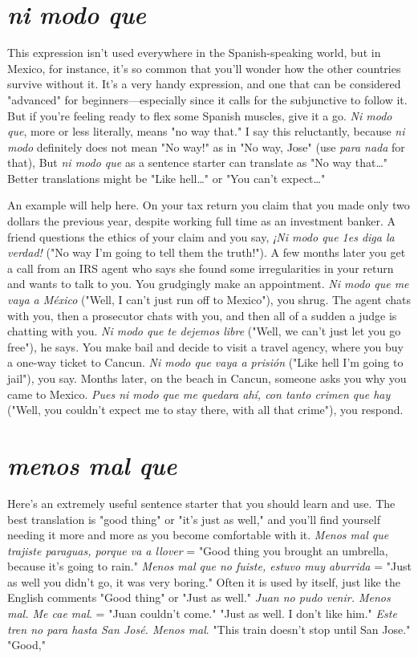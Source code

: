 \section{\emph{ni modo que}}

This expression isn't used everywhere in the Spanish-speaking
world, but in Mexico, for instance, it's so common that you'll wonder
how the other countries survive without it. It's a very handy expression, and one that can be considered "advanced" for beginners---especially since it calls for the subjunctive to follow it. But if you're feeling
ready to flex some Spanish muscles, give it a go. \emph{Ni modo que}, more or
less literally, means "no way that." I say this reluctantly, because \emph{ni
modo} definitely does not mean "No way!" as in "No way, Jose" (use
\emph{para nada} for that), But \emph{ni modo que} as a sentence starter can translate as "No way that\ldots{}" Better translations might be "Like hell\ldots{}"
or "You can't expect\ldots{}"

An example will help here. On your tax return you claim that
you made only two dollars the previous year, despite working full time
as an investment banker. A friend questions the ethics of your claim
and you say, \emph{¡Ni modo que 1es diga la verdad!} ("No way I'm going to
tell them the truth!"). A few months later you get a call from an IRS
agent who says she found some irregularities in your return and wants
to talk to you. You grudgingly make an appointment. \emph{Ni modo que me
vaya a México} ("Well, I can't just run off to Mexico"), you shrug. The
agent chats with you, then a prosecutor chats with you, and then all of
a sudden a judge is chatting with you. \emph{Ni modo que te dejemos libre}
("Well, we can't just let you go free"), he says. You make bail and decide to visit a travel agency, where you buy a one-way ticket to Cancun. \emph{Ni modo que vaya a prisión} ("Like hell I'm going to jail"), you
say. Months later, on the beach in Cancun, someone asks you why you
came to Mexico. \emph{Pues ni modo que me quedara ahí, con tanto crimen
que hay} ("Well, you couldn't expect me to stay there, with all that
crime"), you respond.

\section{\emph{menos mal que}}

Here's an extremely useful sentence starter that you should
learn and use. The best translation is "good thing" or "it's just as
well," and you'll find yourself needing it more and more as you become
comfortable with it. \emph{Menos mal que trajiste paraguas, porque va a
llover} = "Good thing you brought an umbrella, because it's going to
rain." \emph{Menos mal que no fuiste, estuvo muy aburrida} = "Just as well
you didn't go, it was very boring." Often it is used by itself, just like
the English comments "Good thing" or "Just as well." \emph{Juan no pudo
venir. Menos mal. Me cae mal}. = "Juan couldn't come." "Just as well.
I don't like him." \emph{Este tren no para hasta San José. Menos mal}.
"This train doesn't stop until San Jose." "Good,"

